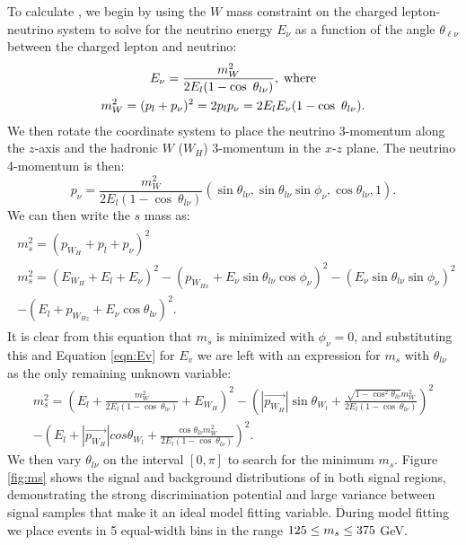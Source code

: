 To calculate \minms, we begin by using the $W$ mass constraint on the charged lepton-neutrino system to solve for the neutrino energy $E_{\nu}$ as a function of the angle $\theta_{\ell\nu}$ between the charged lepton and neutrino:
\begin{equation}
\begin{gathered}
    \label{eqn:Ev}
		E_{\nu} = \frac{m_W^2}{2E_l(1 - \cos\ \theta_{l\nu})},\;{\rm where}\\
		m_W^2 = (p_l + p_{\nu})^2 = 2p_lp_{\nu} = 2E_lE_{\nu}(1 - \cos\ \theta_{l\nu}).
	\end{gathered}
\end{equation}
We then rotate the coordinate system to place the neutrino 3-momentum along the $z$-axis and the hadronic $W$ ($W_H$) 3-momentum in the $x$-$z$ plane. The neutrino 4-momentum is then:
\begin{equation}
	p_{\nu} = \frac{m_W^2}{2E_l(1 - \cos\ \theta_{l\nu})}(\sin \theta_{l\nu}, \sin \theta_{l\nu}\sin \phi_{\nu}, \cos \theta_{l\nu}, 1).
\end{equation}
We can then write the $s$ mass as:
\begin{multline}
\label{eqn:m_s}
	\begin{gathered}
		m_s^2 = (p_{W_H} + p_l + p_{\nu})^2\\
		m_s^2 = (E_{W_H} + E_l + E_{\nu})^2 - (p_{W_{Hx}} + E_{\nu}\sin \theta_{l\nu}\cos \phi_{\nu})^2 - (E_{\nu}\sin \theta_{l\nu}\sin \phi_{\nu})^2 \\- (E_l + p_{W_{Hz}} + E_{\nu}\cos \theta_{l\nu})^2.
	\end{gathered}
\end{multline}
It is clear from this equation that $m_s$ is minimized with $\phi_{\nu} = 0$, and substituting this and Equation \ref{eqn:Ev} for $E_v$ we are left with an expression for $m_s$ with $\theta_{l\nu}$ as the only remaining unknown variable:
\begin{multline}
m_s^2 = \left(E_l + \frac{m_W^2}{2E_l(1 - \cos\ \theta_{l\nu})} + E_{W_H}\right)^2 - \left(|\vec{p_{W_H}}|\sin \theta_{W_l} + \frac{\sqrt{1 - \cos^2 \theta_{l\nu}}m_W^2}{2E_l(1 - \cos\ \theta_{l\nu})}\right)^2 \\- \left(E_l + |\vec{p_{W_H}}|cos \theta_{W_l} + \frac{\cos \theta_{l\nu}m_W^2}{2E_l(1 - \cos\ \theta_{l\nu})}\right)^2.
\end{multline}
We then vary $\theta_{l\nu}$ on the interval $[0,\pi]$ to search for the minimum $m_s$.
Figure \ref{fig:ms} shows the signal and background distributions of \minms in both signal regions, demonstrating the strong discrimination potential and large variance between signal samples that make it an ideal model fitting variable. During model fitting we place events in 5 equal-width bins in the range $125 \leq m_s \leq 375$ GeV.

